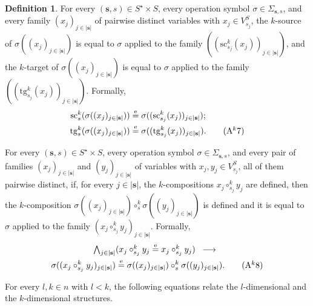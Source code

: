\documentclass[a4paper, reqno]{amsbook}
\newcommand{\eeq}{\overset{\mathrm e}{=}}      %
\newcommand{\src}{\mathrm{sc}}
\newcommand{\tgt}{\mathrm{tg}}
\theoremstyle{plain}
\theoremstyle{definition}
\newtheorem{definition}[theorem]{Definition}
\begin{document}
\begin{definition}
For every $(\mathbf{s},s)\in S^{\star}\times S$, every operation symbol $\sigma\in \Sigma_{\mathbf{s},s}$, and every family $(x_{j})_{j\in \lvert\mathbf{s}\rvert}$ of pairwise distinct variables with $x_{j}\in V^{S}_{s_{j}}$, the $k$-source of $\sigma((x_{j})_{j\in \lvert\mathbf{s}\rvert})$ is equal to $\sigma$ applied to the family $((\src^{k}_{s_{j}}(x_{j}))_{j\in \lvert\mathbf{s}\rvert})$, and the $k$-target of $\sigma((x_{j})_{j\in \lvert\mathbf{s}\rvert})$ is equal to $\sigma$ applied to the family $((\tgt^{k}_{s_{j}}(x_{j}))_{j\in \lvert\mathbf{s}\rvert})$.
Formally,
\begin{align*}
\src^{k}_{s}(\sigma((x_{j})_{j\in \lvert\mathbf{s}\rvert}))&\eeq\sigma((\src^{k}_{s_{j}}(x_{j}))_{j\in \lvert\mathbf{s}\rvert});\\
\tgt^{k}_{s}(\sigma((x_{j})_{j\in \lvert\mathbf{s}\rvert}))&\eeq\sigma((\tgt^{k}_{s_{j}}(x_{j}))_{j\in \lvert\mathbf{s}\rvert}).\label{ACatAk7}\tag{A$^{k}$7}
\end{align*}

For every $(\mathbf{s},s)\in S^{\star}\times S$, every operation symbol $\sigma\in \Sigma_{\mathbf{s},s}$, and every pair of families $(x_{j})_{j\in \lvert\mathbf{s}\rvert}$ and $(y_{j})_{j\in \lvert\mathbf{s}\rvert}$ of variables with $x_{j},y_{j}\in V^{S}_{s_{j}}$, all of them pairwise distinct, if, for every $j\in \lvert\mathbf{s}\rvert$, the $k$-compositions $x_{j}\circ^{k}_{s_{j}}y_{j}$ are defined, then the $k$-composition $\sigma((x_{j})_{j\in \lvert\mathbf{s}\rvert})\circ^{k}_{s}\sigma((y_{j})_{j\in \lvert\mathbf{s}\rvert})$ is defined and it is equal to $\sigma$ applied to the family $(x_{j}\circ^{k}_{s_{j}}y_{j})_{j\in \lvert\mathbf{s}\rvert}$.
Formally,
\begin{multline*}
\textstyle
\bigwedge_{j\in \lvert\mathbf{s}\rvert}
(x_{j}\circ^{k}_{s_{j}} y_{j}\eeq x_{j}\circ^{k}_{s_{j}} y_{j})
\;\;\longrightarrow\;\;\\
\sigma((x_{j}\circ^{k}_{s_{j}}y_{j})_{j\in \lvert\mathbf{s}\rvert})
\eeq
\sigma((x_{j})_{j\in \lvert\mathbf{s}\rvert})\circ^{k}_{s}\sigma((y_{j})_{j\in \lvert\mathbf{s}\rvert}).
\label{ACatAk8}\tag{A$^{k}$8}
\end{multline*}

For every $l,k\in n$ with $l<k$, the following equations relate the $l$-dimensional and the $k$-dimensional structures.


\end{definition}
\end{document}
